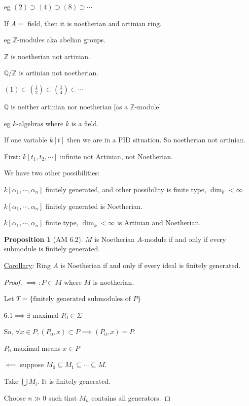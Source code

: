 \documentclass{article}
\theoremstyle{definition}
\newtheorem{proposition}{Proposition}
\begin{document}
eg \((2) \supset (4) \supset (8) \supset \cdots\) 

If \(A =\) field, then it is noetherian and artinian ring.

eg \(\mathbb{Z}\)-modules aka abelian groups.

\(\mathbb{Z}\) is noetherian not artinian.

\(\mathbb{Q} / \mathbb{Z}\) is artinian not noetherian.

\((1) \subset (\frac{1}{2}) \subset (\frac{1}{4}) \subset \cdots\) 

\(\mathbb{Q}\) is neither artinian nor noetherian [as a \(\mathbb{Z}\)-module]

eg \(k\)-algebras where \(k\) is a field.

If one variable \(k[t]\) then we are in a PID situation. So noetherian not artinian.

First: \(k[t_1,t_2,\cdots]\) infinite not Artinian, not Noetherian.

We have two other possibilities:

\(k[\alpha_1,\cdots,\alpha_n]\) finitely generated, and other possibility is finite type, \(\dim_k < \infty\) 

\(k[\alpha_1,\cdots,\alpha_n]\) finitely generated is Noetherian.

\(k[\alpha_1,\cdots,\alpha_n]\) finite type, \(\dim_k < \infty\) is Artinian and Noetherian.  

\begin{proposition}
    [AM 6.2]

    \(M\) is Noetherian \(A\)-module if and only if every submodule is finitely generated.
\end{proposition}

\underline{Corollary}: Ring \(A\) is Noetherian if and only if every ideal is finitely generated.

\begin{proof}
    \(\implies: P \subset M\) where \(M\) is noetherian.
    
    Let \(T = \{ \text{finitely generated submodules of } P \} \)
    
    \(6.1 \implies \exists\) maximal \(P_0 \in \Sigma\)
    
    So, \(\forall x\in P, (P_0,x) \subset P \implies (P_0,x)=P\).
    
    \(P_0\) maximal means \(x\in P\) 

    \(\impliedby\) suppose \(M_0 \subseteq M_1 \subseteq \cdots \subseteq M\).
    
    Take \(\bigcup M_i\). It is finitely generated.
    
    Choose \(n \gg 0\) such that \(M_n\) contains all generators. 
\end{proof}
\end{document}
